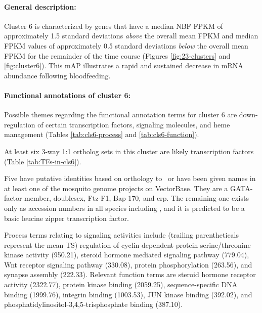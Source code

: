 \paragraph*{General description:}

Cluster 6 is characterized by genes that have a median \gls{NBF} \gls{FPKM} of approximately 1.5 standard deviations \textit{above} the overall mean \gls{FPKM} and median \gls{FPKM} values of approximately 0.5 standard deviations \textit{below} the overall mean \gls{FPKM} for the remainder of the time course (Figures \ref{fig:23-clusters} and \ref{fig:cluster6}).
%
This \gls{mAP} illustrates a rapid and sustained decrease in mRNA abundance following bloodfeeding.
%



\paragraph*{Functional annotations of cluster 6:}





Possible themes regarding the functional annotation terms for cluster 6 are down-regulation of certain transcription factors, signaling molecules, and heme management (Tables \ref{tab:cls6-process} and \ref{tab:cls6-function}).




At least six 3-way 1:1 ortholog sets in this cluster are likely transcription factors (Table \ref{tab:TFs-in-cls6}).

%
Five have putative identities based on orthology to \Dm\ or have been given names in at least one of the mosquito genome projects on VectorBase.
%
They are a GATA-factor member, doublesex, Ftz-F1, Bap 170, and crp.
%
The remaining one exists only as accession numbers in all species including \Dm, and it is predicted to be a basic leucine zipper transcription factor.

Process terms relating to signaling activities include (trailing parentheticals represent the mean \gls{TS}) regulation of cyclin-dependent protein serine/threonine kinase activity (950.21), steroid hormone mediated signaling pathway (779.04), Wnt receptor signaling pathway (330.08), protein phosphorylation (263.56), and synapse assembly (222.33).
%
Relevant function terms are steroid hormone receptor activity (2322.77), protein kinase binding (2059.25), sequence-specific DNA binding (1999.76), integrin binding (1003.53), JUN kinase binding (392.02), and phosphatidylinositol-3,4,5-trisphosphate binding (387.10).

